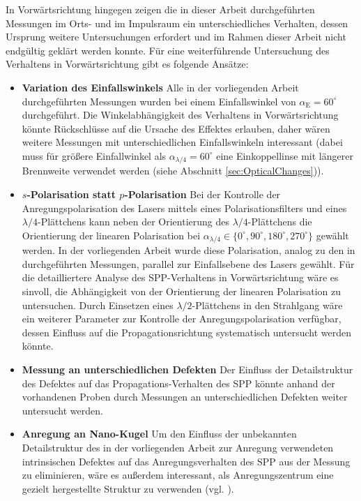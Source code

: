 \documentclass[titlepage,  ngerman]{article}
\begin{document}
	In Vorwärtsrichtung hingegen zeigen die in dieser Arbeit durchgeführten Messungen im Orts- und im Impulsraum ein unterschiedliches Verhalten, dessen Ursprung weitere Untersuchungen erfordert und im Rahmen dieser Arbeit nicht endgültig geklärt werden konnte. Für eine weiterführende Untersuchung des Verhaltens in Vorwärtsrichtung gibt es folgende Ansätze:
	\begin{itemize}
		\item \textbf{Variation des Einfallswinkels} Alle in der vorliegenden Arbeit durchgeführten Messungen wurden bei einem Einfallswinkel von $\alpha_{\mathrm{E}} = 60^\circ$ durchgeführt. Die Winkelabhängigkeit des Verhaltens in Vorwärtsrichtung könnte Rückschlüsse auf die Ursache des Effektes erlauben, daher wären weitere Messungen mit unterschiedlichen Einfallswinkeln interessant (dabei muss für größere Einfallwinkel als $\alpha_{\lambda /4} = 60^\circ$ eine Einkoppellinse mit längerer Brennweite verwendet werden (siehe Abschnitt \ref{sec:OpticalChanges})).
		\item \textbf{$s$-Polarisation statt $p$-Polarisation} Bei der Kontrolle der Anregungspolarisation des Lasers mittels eines Polarisationsfilters und eines $\lambda / 4$-Plättchens kann neben der Orientierung  des $\lambda / 4$-Plättchens die Orientierung der linearen Polarisation bei $\alpha_{\lambda /4} \in \{0^\circ, 90^\circ, 180^\circ, 270^\circ\}$ gewählt werden. In der vorliegenden Arbeit wurde diese Polarisation, analog zu den in \cite{RodriguezFortuno.2013} durchgeführten Messungen, parallel zur Einfallsebene des Lasers gewählt. Für die detailliertere Analyse des SPP-Verhaltens in Vorwärtsrichtung wäre es sinvoll, die Abhängigkeit von der Orientierung der linearen Polarisation zu untersuchen. Durch Einsetzen eines $\lambda /2$-Plättchens in den Strahlgang wäre ein weiterer Parameter zur Kontrolle der Anregungspolarisation verfügbar, dessen Einfluss auf die Propagationsrichtung systematisch untersucht werden könnte.
		\item \textbf{Messung an unterschiedlichen Defekten} Der Einfluss der Detailstruktur des Defektes auf das Propagations-Verhalten des SPP könnte anhand der vorhandenen Proben durch Messungen an unterschiedlichen Defekten weiter untersucht werden.
		\item \textbf{Anregung an Nano-Kugel} Um den Einfluss der unbekannten Detailstruktur des in der vorliegenden Arbeit zur Anregung verwendeten intrinsischen Defektes auf das Anregungsverhalten des SPP aus der Messung zu eliminieren, wäre es außerdem interessant, als Anregungszentrum eine gezielt hergestellte Struktur zu verwenden (vgl. \cite{OConnor.2014}). 

\end{itemize}
\end{document}
